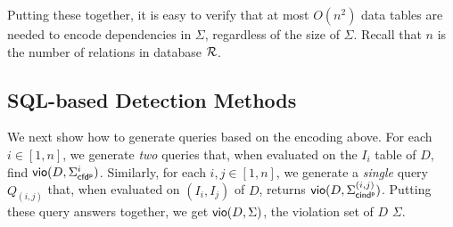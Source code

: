Putting these together, it is easy to verify that at most $O(n^2)$
data tables are needed to encode dependencies in $\Sigma$,
regardless of the size of $\Sigma$. Recall that $n$ is the number of
relations in database $\R$.


\subsection{SQL-based Detection Methods}

We next show how to generate \SQL queries based on the encoding
above. For each $i\in [1, n]$, we generate {\em two} \SQL queries
that, when evaluated on the $I_i$ table of $D$, find ${\mathsf{vio}}(D,
\Sigma_{{\mathsf{cfd^p}}}^i)$. Similarly, for each $i,j \in [1, n]$, we generate a {\em
single} \SQL query $Q_{(i,j)}$ that, when evaluated on $(I_i, I_j)$
of $D$, returns ${\mathsf{vio}}(D, \Sigma_{{\mathsf{cind^p}}}^{(i,j)})$. Putting these query
answers together, we get ${\mathsf{vio}}(D, \Sigma)$, the violation set of
$D$ \wrt $\Sigma$.



